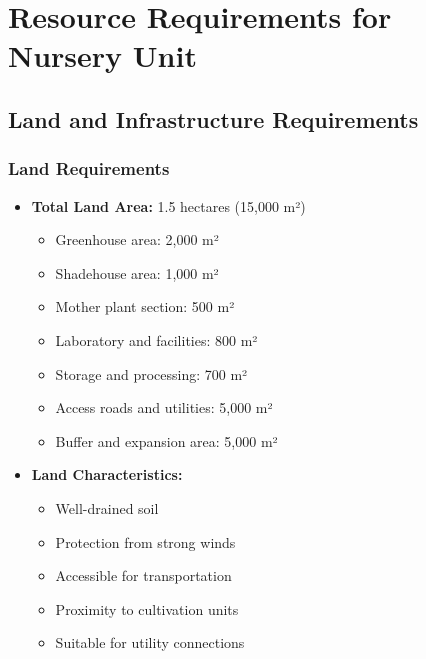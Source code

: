 \section{Resource Requirements for Nursery Unit}

\subsection{Land and Infrastructure Requirements}

\subsubsection{Land Requirements}
\begin{itemize}
    \item \textbf{Total Land Area:} 1.5 hectares (15,000 m²)
    \begin{itemize}
        \item Greenhouse area: 2,000 m²
        \item Shadehouse area: 1,000 m²
        \item Mother plant section: 500 m²
        \item Laboratory and facilities: 800 m²
        \item Storage and processing: 700 m²
        \item Access roads and utilities: 5,000 m²
        \item Buffer and expansion area: 5,000 m²
    \end{itemize}
    
    \item \textbf{Land Characteristics:}
    \begin{itemize}
        \item Well-drained soil
        \item Protection from strong winds
        \item Accessible for transportation
        \item Proximity to cultivation units
        \item Suitable for utility connections
    \end{itemize}
\end{itemize}

